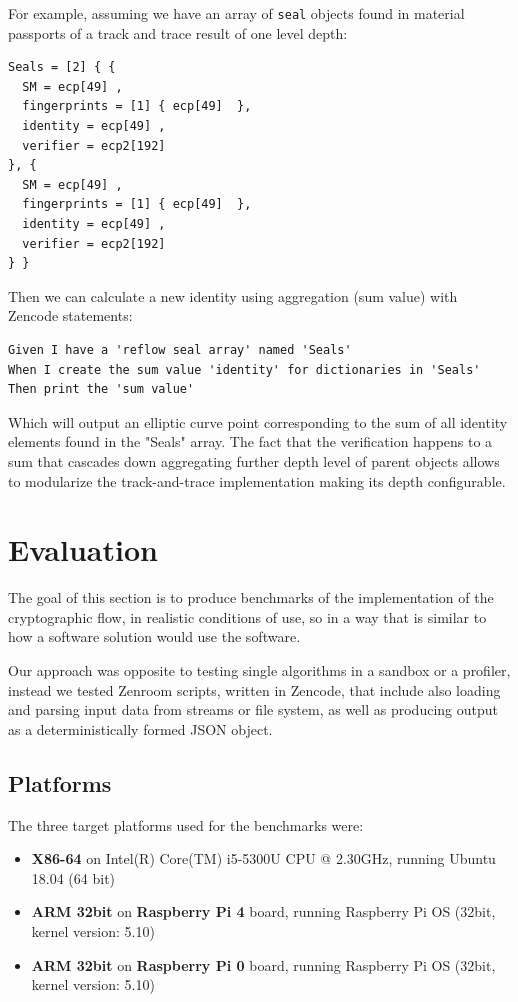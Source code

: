 \documentclass[twocolumn]{article}
\begin{document}
For example, assuming we have an array of \verb!seal! objects found in
material passports of a track and trace result of one level depth:

\begin{lstlisting}[caption={Example material passport data}]
Seals = [2] { {
  SM = ecp[49] ,
  fingerprints = [1] { ecp[49]  },
  identity = ecp[49] ,
  verifier = ecp2[192]
}, {
  SM = ecp[49] ,
  fingerprints = [1] { ecp[49]  },
  identity = ecp[49] ,
  verifier = ecp2[192]
} }
\end{lstlisting}

Then we can calculate a new identity using aggregation (sum value) with
Zencode statements:

\begin{lstlisting}[style=zencode,caption={Aggregate reflow seal identity}]
Given I have a 'reflow seal array' named 'Seals'
When I create the sum value 'identity' for dictionaries in 'Seals'
Then print the 'sum value'
\end{lstlisting}

Which will output an elliptic curve point corresponding to the sum of
all identity elements found in the "Seals" array. The fact that the
verification happens to a sum that cascades down aggregating further
depth level of parent objects allows to modularize the track-and-trace
implementation making its depth configurable.

\twocolumn

\section{Evaluation}
\label{sec:evaluation}

The goal of this section is to produce benchmarks of the implementation of the cryptographic flow, in  realistic conditions of use, so in a way that is similar to how a software solution would use the software. 

Our approach was opposite to testing single algorithms in a sandbox or a profiler, instead we tested Zenroom scripts, written in Zencode, that include also loading and parsing input data from streams or file system, as well as producing output as a deterministically formed JSON object. 

\subsection*{Platforms}
The three target platforms used for the benchmarks were: 
\begin{itemize}
  \item   \textbf{X86-64} on Intel(R) Core(TM) i5-5300U CPU @ 2.30GHz, running Ubuntu 18.04 (64 bit)
  \item   \textbf{ARM 32bit} on \textbf{Raspberry Pi 4} board, running Raspberry Pi OS (32bit, kernel version: 5.10)
  \item  \textbf{ARM 32bit} on \textbf{Raspberry Pi 0} board, running Raspberry Pi OS (32bit, kernel version: 5.10)
\end{itemize}
\end{document}
